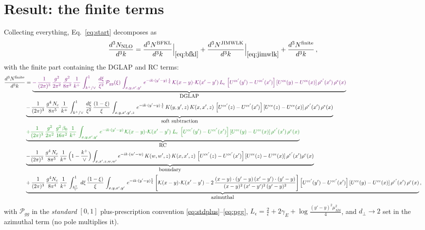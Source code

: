 \documentclass[10pt]{article}
\newcommand{\Leps}{L_{\epsilon}}
\newcommand{\KK}{\mathcal K(x-y)\!\cdot\!\mathcal K(x'-y')}
\newcommand{\Wbr}{\left[U^{ce'}(y') - U^{ce'}(x')\right] \left[U^{ce}(y) - U^{ce}(x)\right] \rho^{e'}(x')\, \rho^{e}(x)}
\begin{document}
\section{Result: the finite terms}
Collecting everything, Eq.~\eqref{eq:start} decomposes as
\begin{align}
\frac{d^{3}N_{\rm NLO}}{d^{3}k}
=\frac{d^{3}N^{\rm BFKL}}{d^{3}k}\Big|_{\eqref{eq:bfkl}}
+\frac{d^{3}N^{\rm JIMWLK}}{d^{3}k}\Big|_{\eqref{eq:jimwlk}}
+\frac{d^{3}N^{\rm finite}}{d^{3}k}\,,
\end{align}
with the finite part containing the DGLAP and RC terms:
\begin{align}\label{eq:finite}
    \frac{d^{3}N^{\rm finite}}{d^{3}k}  & =
   \underbrace{{\color{violet} -\,\frac{1}{(2\pi)^{3}}\,\frac{g^{2}}{2\pi^{2}}\,\frac{g^{2}}{8\pi^{2}}\,\frac{1}{k^{+}}\,\int_{k^{+}/\vee}^{1}\, \frac{d\xi}{\xi^{2}}\,\mathcal{P}_{gg}(\xi)\,\int_{x,y,x',y'}\, e^{-ik\cdot (y'-y)\,\frac{1}{\xi}}\, \KK\,\Leps\,\Wbr}}_{\textstyle \rm DGLAP}
    \notag \\ & \underbrace{-\,\frac{1}{(2\pi)^{3}}\,\frac{g^{4}\,N_{c}}{8\pi^{5}}\, \frac{1}{k^{+}}\,\int_{k^{+}/\vee}^{1}\,\frac{d\xi}{\xi^{2}}\,\frac{(1-\xi)}{\xi}\,\int_{x,y,x',y',z}\, e^{-ik\cdot (y'-y)\,\frac{1}{\xi}}\,K(y,y',z)\,K(x,x',z)\,
\left[U^{ce'}(z) - U^{ce'}(x')\right]\left[U^{ce}(z) - U^{ce}(x)\right]\rho^{e'}(x')\,\rho^{e}(x)}_{\textstyle \rm soft\ subtraction} \notag \\ & \underbrace{{\color{green!60!black}+\frac{1}{(2\pi)^{3}}\, \frac{g^{2}}{2\pi^{2}}\,\frac{g^{2}\,\beta_{0}}{16\pi^{2}}\, \frac{1}{k^{+}}\,\int_{x,y,x',y'}\, e^{-ik\cdot (y'-y)}\, \KK\;\Leps\;\Wbr}}_{\textstyle \rm RC}\notag \\ &
    \underbrace{-\frac{1}{(2\pi)^{3}}\,\frac{g^{4}\,N_{c}}{8\pi^{5}}\,\frac{1}{k^{+}}\,\Big(1-\frac{k^{+}}{\vee}\Big)\int_{x,x',z,w,w'}e^{-ik\cdot (w'-w)}\,K(w,w',z)\,K(x,x',z)\,
\left[U^{ce'}(z) - U^{ce'}(x')\right]\left[U^{ce}(z) - U^{ce}(x)\right]\rho^{e'}(x')\rho^{e}(x)}_{\textstyle \rm boundary} \notag \\
&  \underbrace{+\,\frac{1}{(2\pi)^{3}}\,\frac{g^{4}N_{c}}{8\pi^{4}}\, \frac{1}{k^{+}}\,\int_{\frac{k^{+}}{\vee}}^{1}\,d\xi\, \frac{(1-\xi)}{\xi}\, \int_{x,y,x',y'}\,e^{-ik\cdot (y'-y)\frac{1}{\xi}}\,\Bigg[\KK -2\,\frac{(x-y)\cdot (y'-y)\, (x'-y')\cdot (y'-y)}{(x-y)^{2}\,(x'-y')^{2}\,(y'-y)^{2}}\Bigg]\Wbr}_{\textstyle \rm azimuthal}\,,
\end{align}
with $\mathcal P_{gg}$ in the \emph{standard} $[0,1]$ plus-prescription convention
\eqref{eq:stdplus}--\eqref{eq:pgg}, $\Leps=\frac{2}{\epsilon}+2\gamma_{E}
+\log\frac{(y'-y)^{2}\mu^{2}_{\overline{MS}}}{4}$, and $d_{\perp}\to2$ set in the azimuthal term
(no pole multiplies it).
\end{document}
